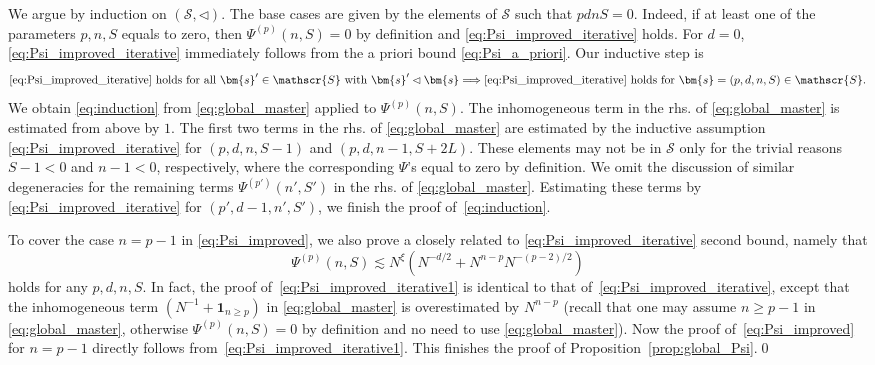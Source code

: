 \documentclass[10pt]{amsart}
\numberwithin{equation}{section}
\begin{document}
We argue by induction on $(\mathscr{S},\lhd)$. The base cases are given by the elements of $\mathscr{S}$ such that $pdnS=0$. Indeed, if at least one of the parameters $p,n,S$ equals to zero, then $\Psi^{(p)}(n,S)=0$ by definition and \eqref{eq:Psi_improved_iterative} holds. For $d=0$, \eqref{eq:Psi_improved_iterative} immediately follows from the a priori bound \eqref{eq:Psi_a_priori}. Our inductive step is
\begin{equation}
\eqref{eq:Psi_improved_iterative} \text{ holds for all } \bm{s}'\in\mathscr{S}\text{ with }\bm{s}'\lhd \bm{s}\Longrightarrow \eqref{eq:Psi_improved_iterative} \text{ holds for } \bm{s}=(p,d,n,S)\in\mathscr{S}.  
\label{eq:induction}
\end{equation}
We obtain \eqref{eq:induction} from \eqref{eq:global_master} applied to $\Psi^{(p)}(n,S)$. The inhomogeneous term in the rhs. of \eqref{eq:global_master} is estimated from above by $1$. The first two terms in the rhs. of \eqref{eq:global_master} are estimated by the inductive assumption \eqref{eq:Psi_improved_iterative} for $(p,d,n,S-1)$ and $(p,d,n-1,S+2L)$. These elements may not be in $\mathscr{S}$ only for the trivial reasons $S-1<0$ and $n-1<0$, respectively, where the corresponding $\Psi$'s equal to zero by definition. We omit the discussion of similar degeneracies for the remaining terms $\Psi^{(p')}(n',S')$ in the rhs. of \eqref{eq:global_master}. Estimating these terms by \eqref{eq:Psi_improved_iterative} for $(p',d-1,n',S')$, we finish the proof of~\eqref{eq:induction}.

To cover the case $n=p-1$ in \eqref{eq:Psi_improved}, we also prove a closely related to \eqref{eq:Psi_improved_iterative} second bound, namely that
\begin{equation}
\Psi^{(p)}(n,S)\lesssim N^\xi\left( N^{-d/2} + N^{n-p}N^{-(p-2)/2}\right)
\label{eq:Psi_improved_iterative1}
\end{equation}
holds for any $p, d, n, S$. In fact, the proof of~\eqref{eq:Psi_improved_iterative1} is identical to that of~\eqref{eq:Psi_improved_iterative}, except that the inhomogeneous term $\left( N^{-1} + \bm{1}_{n\ge p}\right)$ in \eqref{eq:global_master} is overestimated by $N^{n-p}$ (recall that one may assume  $n\ge p-1$ in \eqref{eq:global_master}, otherwise $\Psi^{(p)}(n, S)=0$ by definition and no need to use  \eqref{eq:global_master}). Now the proof of~\eqref{eq:Psi_improved} for $n=p-1$ directly follows from~\eqref{eq:Psi_improved_iterative1}. This finishes the proof of Proposition~\ref{prop:global_Psi}.\hfill\qed
\end{document}
